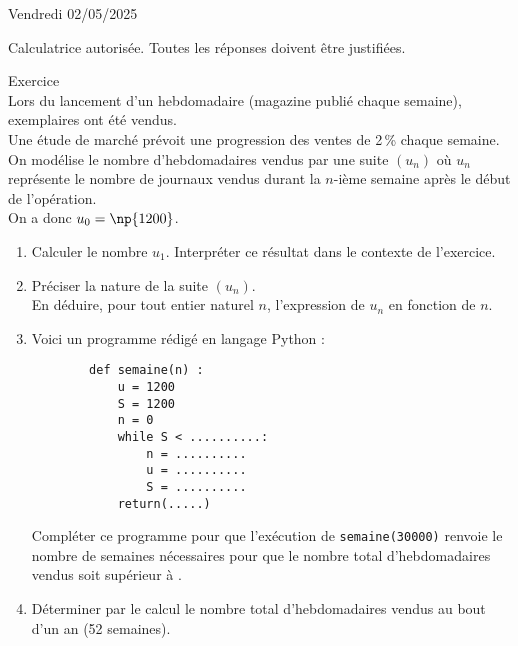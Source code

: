 \documentclass[a4paper,11pt,eval]{nsi}
\newcounter{exoNum}
\newcommand{\exo}[1]
{
	\addtocounter{exoNum}{1}
	{\titlefont\color{UGLiBlue}\Large Exercice\ \theexoNum\ \normalsize{#1}}\smallskip	
}
\begin{document}
\textcolor{UGLiBlue}{Vendredi 02/05/2025}\\
\maketitle
\begin{center}
	Calculatrice autorisée. Toutes les réponses doivent être justifiées.
\end{center}

\vspace*{1cm}

\exo{}\\
Lors du lancement d'un hebdomadaire (magazine publié chaque semaine),  exemplaires ont été vendus.\\
Une étude de marché prévoit une progression des ventes de 2\,\% chaque semaine.\\
On modélise le nombre d'hebdomadaires vendus par une suite $\left(u_n\right)$ où $u_n$ représente le nombre de journaux vendus durant la $n$-ième semaine après le début de l'opération.\\
On a donc $u_0 = \np{1200}$.


\begin{enumerate}
\item Calculer le nombre $u_1$. Interpréter ce résultat dans le contexte de l'exercice.\\[.5em]
\item Préciser la nature de la suite $(u_n)$.\\
En déduire, pour tout entier naturel $n$, l'expression de $u_n$ en fonction de $n$.\\[.5em]
\item Voici un programme rédigé en langage Python :

\begin{pyc}
    \begin{verbatim}
        def semaine(n) :
            u = 1200
            S = 1200
            n = 0
            while S < ..........:
                n = ..........
                u = ..........
                S = ..........
            return(.....)
    \end{verbatim}
\end{pyc}
Compléter ce programme pour que l'exécution de \texttt{semaine(30000)} renvoie le nombre de semaines nécessaires pour que le nombre total d'hebdomadaires vendus soit supérieur à .
\item Déterminer par le calcul le nombre total d'hebdomadaires vendus au bout d'un an (52 semaines).\\[.5em]
\end{enumerate}
\end{document}
